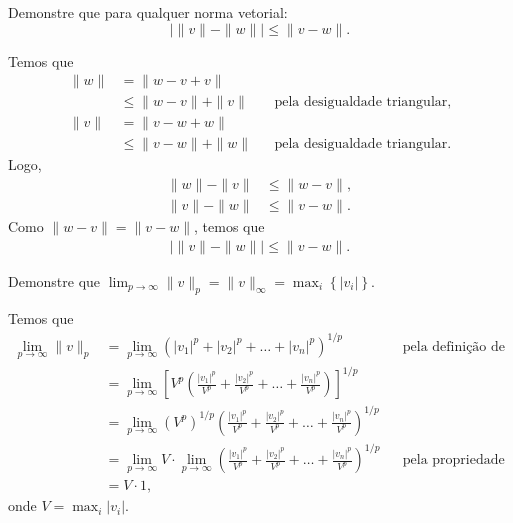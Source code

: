 \documentclass[a4paper,12pt, leqno, answers]{exam}
\begin{document}
\begin{questions}
    \question Demonstre que para qualquer norma vetorial:
    \[
    | \| v \| - \| w \| | \leq \| v - w \|.
    \]
    \begin{solution}
        Temos que
        \begin{align*}
            \| w \| &= \| w - v + v \| \\
            &\leq \| w - v \| + \| v \| && \text{pela desigualdade triangular,} \\
            \| v \| &= \| v - w + w \| \\
            &\leq \| v - w \| + \| w \| && \text{pela desigualdade triangular.}
        \end{align*}
        Logo,
        \begin{align*}
            \| w \| - \| v \| &\leq \| w - v \|, \\
            \| v \| - \| w \| &\leq \| v - w \|.
        \end{align*}
        Como $\| w - v \| = \| v - w \|$, temos que
        \begin{align*}
            | \| v \| - \| w \| | \leq \| v - w \|.
        \end{align*}
    \end{solution}

    \question Demonstre que $\lim_{p \rightarrow \infty} \| v \|_p = \| v \|_\infty = \max_i \left\{ | v_i | \right\}$.
    \begin{solution}
        Temos que
        \begin{align*}
            \lim_{p \to \infty} \| v \|_p &= \lim_{p \to \infty} \left( | v_1 |^p + | v_2 |^p + \ldots + | v_n |^p \right)^{1 / p} && \text{pela defini\c{c}\~{a}o de norma} \\
            &= \lim_{p \to \infty} \left[ V^p \left( \frac{| v_1 |^p}{V^p} + \frac{| v_2 |^p}{V^p} + \ldots + \frac{| v_n |^p}{V^p} \right) \right]^{1 / p} \\
            &= \lim_{p \to \infty} \left( V^p \right)^{1 / p} \left( \frac{| v_1 |^p}{V^p} + \frac{| v_2 |^p}{V^p} + \ldots + \frac{| v_n |^p}{V^p} \right)^{1 / p} \\
            &= \lim_{p \to \infty} V \cdot \lim_{p \to \infty} \left( \frac{| v_1 |^p}{V^p} + \frac{| v_2 |^p}{V^p} + \ldots + \frac{| v_n |^p}{V^p} \right)^{1 / p} && \text{pela propriedade do limite}\\
            &= V \cdot 1,
        \end{align*}
        onde $V = \max_i | v_i |$.
    \end{solution}


\end{questions}
\end{document}
